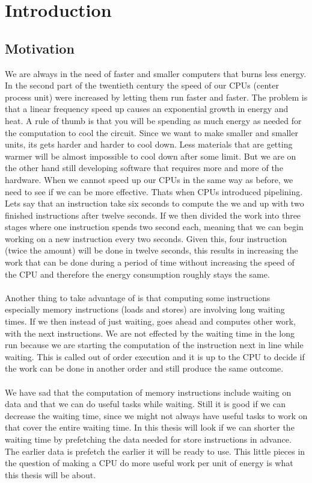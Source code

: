 \chapter{Introduction}
\label{chap:In}
 \section{Motivation}
 \label{sec:motivation}
We are always in the need of faster and smaller computers that burns less energy. In
the second part of the twentieth century the speed of our CPUs (center process unit)
were increased by letting them run faster and faster. The problem is that a linear
frequency speed up causes an exponential growth in energy and heat. A rule of thumb
is that you will be spending as much energy as needed for the computation to cool the
circuit. Since we want to make smaller and smaller units, its gets harder and harder
to cool down. Less materials that are getting warmer will be almost impossible to
cool down after some limit. But we are on the other hand still developing software
that requires more and more of the hardware. When we cannot speed up our CPUs
in the same way as before, we need to see if we can be more effective. Thats when
CPUs introduced pipelining. Lets say that an instruction take six seconds to compute
the we and up with two finished instructions after twelve seconds. If we then divided
the work into three stages where one instruction spends two second each, meaning
that we can begin working on a new instruction every two seconds. Given this, four
instruction (twice the amount) will be done in twelve seconds, this results in increasing
the work that can be done during a period of time without increasing the speed
of the CPU and therefore the energy consumption roughly stays the same.
\\ \\
Another thing to take advantage of is that computing some instructions especially
memory instructions (loads and stores) are involving long waiting times. If we then
instead of just waiting, goes ahead and computes other work, with the next instructions.
We are not effected by the waiting time in the long run because we are starting
the computation of the instruction next in line while waiting. This is called out of
order execution and it is up to the CPU to decide if the work can be done in another
order and still produce the same outcome.
\\ \\
We have sad that the computation of memory instructions include waiting on data
and that we can do useful tasks while waiting. Still it is good if we can decrease the
waiting time, since we might not always have useful tasks to work on that cover the
entire waiting time. In this thesis will look if we can shorter the waiting time by
prefetching the data needed for store instructions in advance. The earlier data is
prefetch the earlier it will be ready to use. This little pieces in the question of making
a CPU do more useful work per unit of energy is what this thesis will be about.

